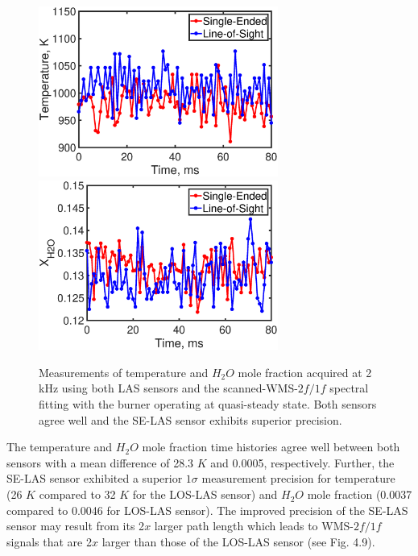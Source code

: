 \begin{figure} \centering 
\includegraphics[width=0.7\textwidth]{fig/ch4_fig9_2.eps}  
\includegraphics[width=0.7\textwidth]{fig/ch4_fig9_1.eps}  
\caption{Measurements of temperature and $H_2O$ mole fraction acquired at 2 kHz using both LAS sensors and the scanned-WMS-$2f/1f$ spectral fitting with the burner operating at quasi-steady state. Both sensors agree well and the SE-LAS sensor exhibits superior precision.}
    \label{fig:ch4_10}
\end{figure}



The temperature and $H_2O$ mole fraction time histories agree well between both sensors with a mean difference of 28.3 $K$ and 0.0005, respectively. Further, the SE-LAS sensor exhibited a superior $1\sigma$ measurement precision for temperature (26 $K$ compared to 32 $K$ for the LOS-LAS sensor) and $H_2O$ mole fraction (0.0037 compared to 0.0046 for LOS-LAS sensor). The improved precision of the SE-LAS sensor may result from its 2$x$ larger path length which leads to WMS-$2f/1f$ signals that are 2$x$ larger than those of the LOS-LAS sensor (see Fig. 4.9). 

\vspace{15mm}

